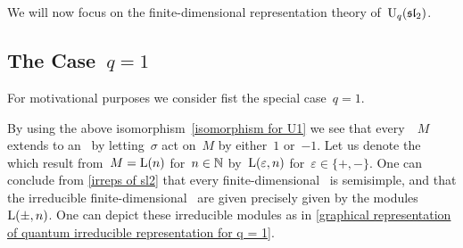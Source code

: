 \documentclass[a4paper, 11pt, oneside]{scrartcl}
\begin{document}
We will now focus on the finite-dimensional representation theory of~$\operatorname{U}_q(\mathfrak{sl}_2)$.



\subsection{The Case~\texorpdfstring{$q = 1$}{q=1}}
\label{representation theory of quantum U1}

For motivational purposes we consider fist the special case~$q = 1$.

By using the above isomorphism~\eqref{isomorphism for U1} we see that every~~$M$ extends to an~ by letting~$\sigma$ act on~$M$ by either~$1$ or~$-1$.
Let us denote the~ which result from~$M = \operatorname{L}(n)$ for~$n \in \mathbb{N}$ by~$\operatorname{L}(\varepsilon, n)$ for~$\varepsilon \in \{+, -\}$.
One can conclude from \cref{irreps of sl2} that every finite-dimensional~ is semisimple, and that the irreducible finite-dimensional~ are given precisely given by the modules~$\operatorname{L}(\pm, n)$.
One can depict these irreducible modules as in \cref{graphical representation of quantum irreducible representation for q = 1}.
\end{document}
